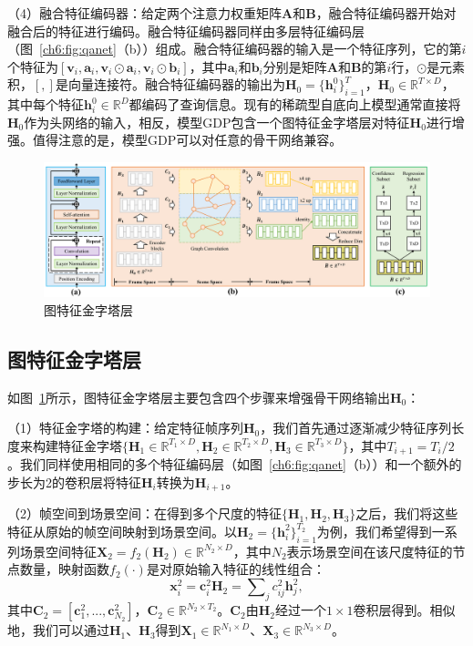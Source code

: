 （4）融合特征编码器：给定两个注意力权重矩阵$\bm{A}$和$\bm{B}$，融合特征编码器开始对融合后的特征进行编码。融合特征编码器同样由多层特征编码层（图~\ref{ch6:fig:qanet}（b））组成。融合特征编码器的输入是一个特征序列，它的第$i$个特征为$[\bm{v}_i, \bm{a}_i, \bm{v}_i\odot \bm{a}_i, \bm{v}_i\odot \bm{b}_i]$，其中$\bm{a}_i$和$\bm{b}_i$分别是矩阵$\bm{A}$和$\bm{B}$的第$i$行，$\odot$是元素积，$[,]$是向量连接符。融合特征编码器的输出为$\bm{H}_0=\{\bm{h}^0_i\}^T_{i=1}$，$\bm{H}_0 \in \mathbb{R}^{T\times D}$，其中每个特征$\bm{h}^0_i \in \mathbb{R}^D$都编码了查询信息。现有的稀疏型自底向上模型通常直接将$\bm{H}_0$作为头网络的输入，相反，模型GDP包含一个图特征金字塔层对特征$\bm{H}_0$进行增强。值得注意的是，模型GDP可以对任意的骨干网络兼容。

\begin{figure}[t]
    \centering
    \includegraphics[width=0.98\linewidth]{chapter6/res/graph_fpn.pdf}
    \caption{图特征金字塔层}
    \label{ch6:fig:graph_fpn}
\end{figure}

\subsection{图特征金字塔层}
如图~\ref{ch6:fig:graph_fpn}所示，图特征金字塔层主要包含四个步骤来增强骨干网络输出$\bm{H}_0$：

（1）特征金字塔的构建：给定特征帧序列$\bm{H}_0$，我们首先通过逐渐减少特征序列长度来构建特征金字塔$\{\bm{H}_1 \in \mathbb{R}^{T_1\times D}, \bm{H}_2 \in \mathbb{R}^{T_2\times D}, \bm{H}_3 \in \mathbb{R}^{T_3\times D}\}$，其中$T_{i+1} = T_i/2$。我们同样使用相同的多个特征编码层（如图~\ref{ch6:fig:qanet}（b））和一个额外的步长为2的卷积层将特征$\bm{H}_i$转换为$\bm{H}_{i+1}$。

（2）帧空间到场景空间：在得到多个尺度的特征$\{\bm{H}_1, \bm{H}_2, \bm{H}_3\}$之后，我们将这些特征从原始的帧空间映射到场景空间。以$\bm{H}_2 = \{\bm{h}^2_i\}^{T_2}_{i=1}$为例，我们希望得到一系列场景空间特征$\bm{X}_2 = f_2(\bm{H}_2) \in \mathbb{R}^{N_2\times D}$，其中$N_2$表示场景空间在该尺度特征的节点数量，映射函数$f_2(\cdot)$是对原始输入特征的线性组合：
\begin{equation} \label{ch6:eq:eq_2}
    \bm{x}^2_i = \bm{c}^2_i \bm{H}_2 = \sum\nolimits_j c^2_{ij}\bm{h}^2_j,
\end{equation}
其中$\bm{C}_2 = [\bm{c}^2_1, ..., \bm{c}^2_{N_2}]$，$\bm{C}_2 \in \mathbb{R}^{N_2\times T_2}$。$\bm{C}_2$由$\bm{H}_2$经过一个$1\times1$卷积层得到。相似地，我们可以通过$\bm{H}_1$、$\bm{H}_3$得到$\bm{X}_1 \in \mathbb{R}^{N_1\times D}$、$\bm{X}_3 \in \mathbb{R}^{N_3\times D}$。

